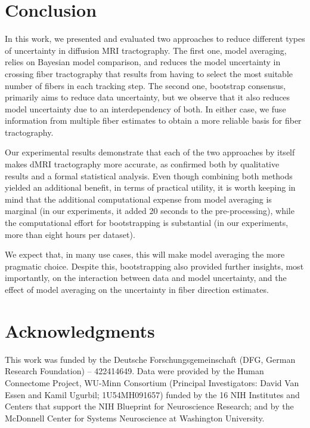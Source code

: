 \section{Conclusion}
\label{sec:conclusion}
In this work, we presented and evaluated two approaches to reduce different types of uncertainty in diffusion MRI tractography. The first one, model averaging, relies on Bayesian model comparison, and reduces the model uncertainty in crossing fiber tractography that results from having to select the most suitable number of fibers in each tracking step. The second one, bootstrap consensus, primarily aims to reduce data uncertainty, but we observe that it also reduces model uncertainty due to an interdependency of both. In either case, we fuse information from multiple fiber estimates to obtain a more reliable basis for fiber tractography.

Our experimental results demonstrate that each of the two approaches by itself makes dMRI tractography more accurate, as confirmed both by qualitative results and a formal statistical analysis. Even though combining both methods yielded an additional benefit, in terms of practical utility, it is worth keeping in mind that the additional computational expense from model averaging is marginal (in our experiments, it added 20 seconds to the pre-processing), while the computational effort for bootstrapping is substantial (in our experiments, more than eight hours per dataset).

We expect that, in many use cases, this will make model averaging the more pragmatic choice. Despite this, bootstrapping also provided further insights, most importantly, on the interaction between data and model uncertainty, and the effect of model averaging on the uncertainty in fiber direction estimates.

\section*{Acknowledgments}

This work was funded by the Deutsche Forschungsgemeinschaft (DFG, German Research Foundation) -- 422414649.
Data were provided by the Human Connectome Project, WU-Minn Consortium (Principal Investigators: David Van Essen and Kamil Ugurbil; 1U54MH091657) funded by the 16 NIH Institutes and Centers that support the NIH Blueprint
for Neuroscience Research; and by the McDonnell Center for Systems Neuroscience at Washington University.

